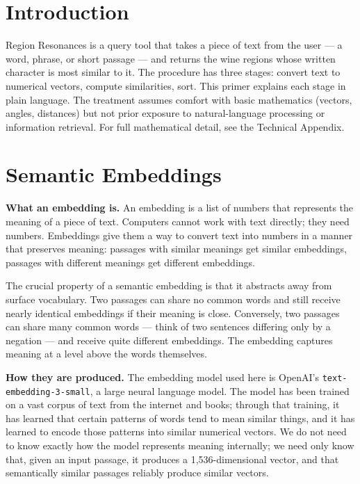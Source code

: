 \documentclass[11pt]{article}
\begin{document}

\section*{Introduction}
Region Resonances is a query tool that takes a piece of text from the user --- a word, phrase, or short passage --- and returns the wine regions whose written character is most similar to it. The procedure has three stages: convert text to numerical vectors, compute similarities, sort. This primer explains each stage in plain language. The treatment assumes comfort with basic mathematics (vectors, angles, distances) but not prior exposure to natural-language processing or information retrieval. For full mathematical detail, see the Technical Appendix.

\section{Semantic Embeddings}

\textbf{What an embedding is.} An embedding is a list of numbers that represents the meaning of a piece of text. Computers cannot work with text directly; they need numbers. Embeddings give them a way to convert text into numbers in a manner that preserves meaning: passages with similar meanings get similar embeddings, passages with different meanings get different embeddings.

The crucial property of a semantic embedding is that it abstracts away from surface vocabulary. Two passages can share no common words and still receive nearly identical embeddings if their meaning is close. Conversely, two passages can share many common words --- think of two sentences differing only by a negation --- and receive quite different embeddings. The embedding captures meaning at a level above the words themselves.

\textbf{How they are produced.} The embedding model used here is OpenAI's \texttt{text-embedding-3-small}, a large neural language model. The model has been trained on a vast corpus of text from the internet and books; through that training, it has learned that certain patterns of words tend to mean similar things, and it has learned to encode those patterns into similar numerical vectors. We do not need to know exactly how the model represents meaning internally; we need only know that, given an input passage, it produces a 1{,}536-dimensional vector, and that semantically similar passages reliably produce similar vectors.
\end{document}
